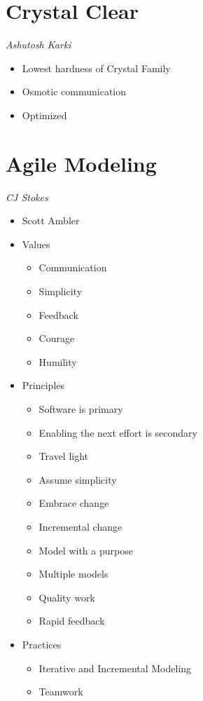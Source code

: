 \documentclass{report}
\begin{document}
		\section{Crystal Clear}
			\textit{Ashutosh Karki}
			\begin{itemize}
				\item Lowest hardness of Crystal Family
				\item Osmotic communication
				\item Optimized
			\end{itemize}
		\section{Agile Modeling}
			\textit{CJ Stokes}
			\begin{itemize}
				\item Scott Ambler
				\item Values
					\begin{itemize}
						\item Communication
						\item Simplicity
						\item Feedback
						\item Courage
						\item Humility
					\end{itemize}
				\item Principles
					\begin{itemize}
						\item Software is primary
						\item Enabling the next effort is secondary
						\item Travel light
						\item Assume simplicity
						\item Embrace change
						\item Incremental change
						\item Model with a purpose
						\item Multiple models
						\item Quality work
						\item Rapid feedback
					\end{itemize}
				\item Practices
					\begin{itemize}
						\item Iterative and Incremental Modeling
						\item Teamwork
					\end{itemize}
			\end{itemize}
\end{document}

